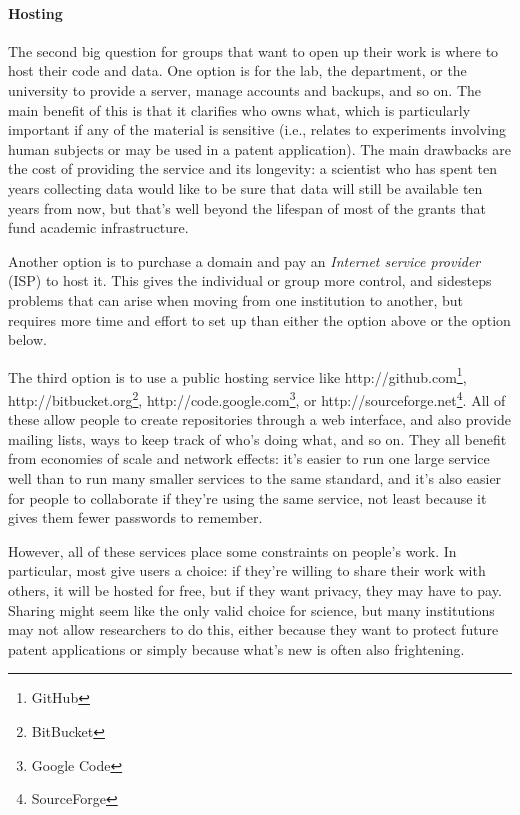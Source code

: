 \documentclass[]{book}
\newcommand{\urlfoot}[2]{{#1}\footnote{#2}}
\newcommand{\gdef}[2]{\emph{#2}}
\begin{document}
\mbox{}\paragraph{Hosting}

The second big question for groups that want to open up their work is
where to host their code and data. One option is for the lab, the
department, or the university to provide a server, manage accounts and
backups, and so on. The main benefit of this is that it clarifies who
owns what, which is particularly important if any of the material is
sensitive (i.e., relates to experiments involving human subjects or may
be used in a patent application). The main drawbacks are the cost of
providing the service and its longevity: a scientist who has spent ten
years collecting data would like to be sure that data will still be
available ten years from now, but that's well beyond the lifespan of
most of the grants that fund academic infrastructure.

Another option is to purchase a domain and pay an
\gdef{g:isp}{Internet service provider} (ISP) to host it. This gives
the individual or group more control, and sidesteps problems that can
arise when moving from one institution to another, but requires more
time and effort to set up than either the option above or the option
below.

The third option is to use a public hosting service like
\urlfoot{http://github.com}{GitHub},
\urlfoot{http://bitbucket.org}{BitBucket},
\urlfoot{http://code.google.com}{Google Code}, or
\urlfoot{http://sourceforge.net}{SourceForge}. All of these allow people to
create repositories through a web interface, and also provide mailing
lists, ways to keep track of who's doing what, and so on. They all
benefit from economies of scale and network effects: it's easier to run
one large service well than to run many smaller services to the same
standard, and it's also easier for people to collaborate if they're
using the same service, not least because it gives them fewer passwords
to remember.

However, all of these services place some constraints on people's work.
In particular, most give users a choice: if they're willing to share
their work with others, it will be hosted for free, but if they want
privacy, they may have to pay. Sharing might seem like the only valid
choice for science, but many institutions may not allow researchers to
do this, either because they want to protect future patent applications
or simply because what's new is often also frightening.
\end{document}
